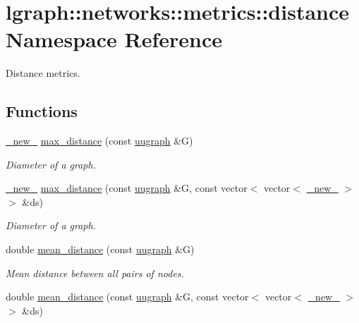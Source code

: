 \hypertarget{namespacelgraph_1_1networks_1_1metrics_1_1distance}{}\section{lgraph\+:\+:networks\+:\+:metrics\+:\+:distance Namespace Reference}
\label{namespacelgraph_1_1networks_1_1metrics_1_1distance}


Distance metrics.  


\subsection*{Functions}
\begin{DoxyCompactItemize}
\item 
\hyperlink{namespacelgraph_1_1utils_a2c84bfde888c42ab3ad6b2cb8a364240}{\+\_\+new\+\_\+} \hyperlink{namespacelgraph_1_1networks_1_1metrics_1_1distance_a8cf3894730f48400e043e09845aa9382}{max\+\_\+distance} (const \hyperlink{classlgraph_1_1utils_1_1uugraph}{uugraph} \&G)
\begin{DoxyCompactList}\small\item\em Diameter of a graph. \end{DoxyCompactList}\item 
\hyperlink{namespacelgraph_1_1utils_a2c84bfde888c42ab3ad6b2cb8a364240}{\+\_\+new\+\_\+} \hyperlink{namespacelgraph_1_1networks_1_1metrics_1_1distance_aac4e62e4a403a765c30404c0384bacec}{max\+\_\+distance} (const \hyperlink{classlgraph_1_1utils_1_1uugraph}{uugraph} \&G, const vector$<$ vector$<$ \hyperlink{namespacelgraph_1_1utils_a2c84bfde888c42ab3ad6b2cb8a364240}{\+\_\+new\+\_\+} $>$ $>$ \&ds)
\begin{DoxyCompactList}\small\item\em Diameter of a graph. \end{DoxyCompactList}\item 
double \hyperlink{namespacelgraph_1_1networks_1_1metrics_1_1distance_a8f6f4a9b19b9a93c37a6ed9a27418440}{mean\+\_\+distance} (const \hyperlink{classlgraph_1_1utils_1_1uugraph}{uugraph} \&G)
\begin{DoxyCompactList}\small\item\em Mean distance between all pairs of nodes. \end{DoxyCompactList}\item 
double \hyperlink{namespacelgraph_1_1networks_1_1metrics_1_1distance_af6fb63e1dd2c925bf8a79123e2b382de}{mean\+\_\+distance} (const \hyperlink{classlgraph_1_1utils_1_1uugraph}{uugraph} \&G, const vector$<$ vector$<$ \hyperlink{namespacelgraph_1_1utils_a2c84bfde888c42ab3ad6b2cb8a364240}{\+\_\+new\+\_\+} $>$ $>$ \&ds)

\end{DoxyCompactItemize}
